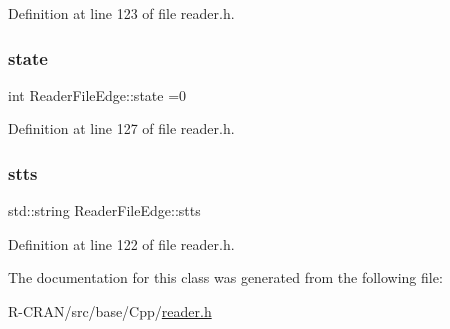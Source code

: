 Definition at line 123 of file reader.\+h.

\mbox{\label{classReaderFileEdge_ac1fdd420eec23e7a50bb73c456c6695b}} 
\subsubsection{\texorpdfstring{state}{state}}
{\footnotesize\ttfamily int Reader\+File\+Edge\+::state =0\hspace{0.3cm}{\ttfamily [private]}}



Definition at line 127 of file reader.\+h.

\mbox{\label{classReaderFileEdge_ad530588bc2c71763272396a695e93a8e}} 
\subsubsection{\texorpdfstring{stts}{stts}}
{\footnotesize\ttfamily std\+::string Reader\+File\+Edge\+::stts\hspace{0.3cm}{\ttfamily [private]}}



Definition at line 122 of file reader.\+h.



The documentation for this class was generated from the following file\+:\begin{DoxyCompactItemize}
\item 
R-\/\+C\+R\+A\+N/src/base/\+Cpp/\hyperlink{reader_8h}{reader.\+h}\end{DoxyCompactItemize}
